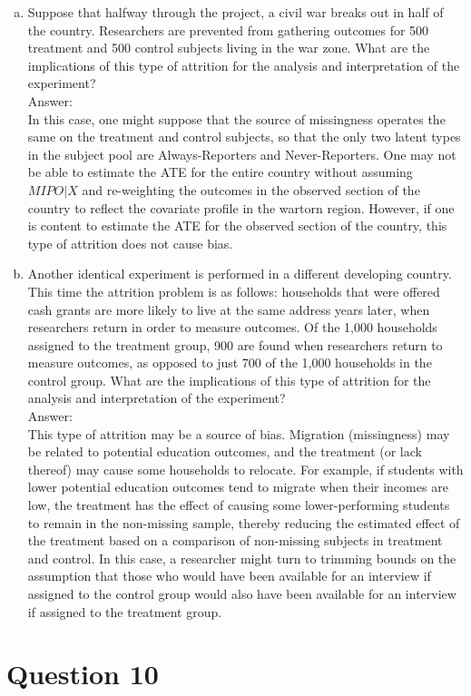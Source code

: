 \documentclass[11pt,notitlepage]{article}\usepackage[]{graphicx}\usepackage[]{color}
\makeatletter
\newenvironment{kframe}{%
 \def\at@end@of@kframe{}%
 \ifinner\ifhmode%
  \def\at@end@of@kframe{\end{minipage}}%
  \begin{minipage}{\columnwidth}%
 \fi\fi%
 \def\FrameCommand##1{\hskip\@totalleftmargin \hskip-\fboxsep
 \colorbox{shadecolor}{##1}\hskip-\fboxsep
     \hskip-\linewidth \hskip-\@totalleftmargin \hskip\columnwidth}%
 \MakeFramed {\advance\hsize-\width
   \@totalleftmargin\z@ \linewidth\hsize
   \@setminipage}}%
 {\par\unskip\endMakeFramed%
 \at@end@of@kframe}
\newenvironment{knitrout}{}{} %
\makeatother
\begin{document}
\begin{enumerate}[a)]
\item Suppose that halfway through the project, a civil war breaks out in half of the country. Researchers are prevented from gathering outcomes for 500 treatment and 500 control subjects living in the war zone. What are the implications of this type of attrition for the analysis and interpretation of the experiment?\\
Answer:\\
In this case, one might suppose that the source of missingness operates the same on the treatment and control subjects, so that the only two latent types in the subject pool are Always-Reporters and Never-Reporters. One may not be able to estimate the ATE for the entire country without assuming $MIPO|X$ and re-weighting the outcomes in the observed section of the country to reflect the covariate profile in the wartorn region. However, if one is content to estimate the ATE for the observed section of the country, this type of attrition does not cause bias.

\item Another identical experiment is performed in a different developing country. This time the attrition problem is as follows: households that were offered cash grants are more likely to live at the same address years later, when researchers return in order to measure outcomes. Of the 1,000 households assigned to the treatment group, 900 are found when researchers return to measure outcomes, as opposed to just 700 of the 1,000 households in the control group. What are the implications of this type of attrition for the analysis and interpretation of the experiment?\\
Answer:\\
This type of attrition may be a source of bias. Migration (missingness) may be related to potential education outcomes, and the treatment (or lack thereof) may cause some households to relocate. For example, if students with lower potential education outcomes tend to migrate when their incomes are low, the treatment has the effect of causing some lower-performing students to remain in the non-missing sample, thereby reducing the estimated effect of the treatment based on a comparison of non-missing subjects in treatment and control. In this case, a researcher might turn to trimming bounds on the assumption that those who would have been available for an interview if assigned to the control group would also have been available for an interview if assigned to the treatment group.
\end{enumerate}

\section*{Question 10}
\begin{knitrout}
\color{fgcolor}\begin{kframe}
\begin{verbatim}






\end{verbatim}
\end{kframe}
\end{knitrout}
\end{document}
